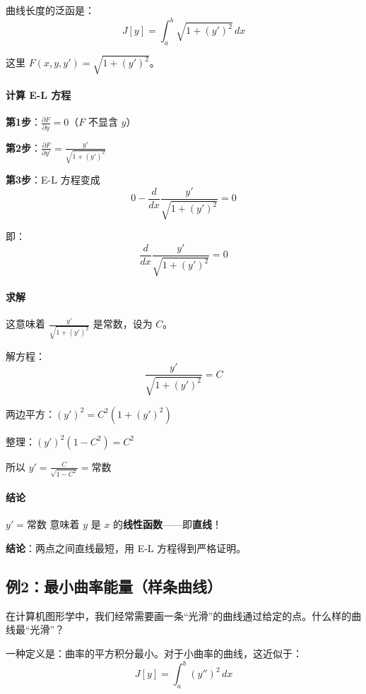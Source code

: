 曲线长度的泛函是：
\[
J[y] = \int_a^b \sqrt{1 + (y')^2} \, dx
\]

这里 $F(x, y, y') = \sqrt{1 + (y')^2}$。

\paragraph{计算 E-L 方程}

\textbf{第1步}：$\frac{\partial F}{\partial y} = 0$（$F$ 不显含 $y$）

\textbf{第2步}：$\frac{\partial F}{\partial y'} = \frac{y'}{\sqrt{1 + (y')^2}}$

\textbf{第3步}：E-L 方程变成
\[
0 - \frac{d}{dx} \frac{y'}{\sqrt{1 + (y')^2}} = 0
\]

即：
\[
\frac{d}{dx} \frac{y'}{\sqrt{1 + (y')^2}} = 0
\]

\paragraph{求解}

这意味着 $\frac{y'}{\sqrt{1 + (y')^2}}$ 是常数，设为 $C$。

解方程：
\[
\frac{y'}{\sqrt{1 + (y')^2}} = C
\]

两边平方：$(y')^2 = C^2 (1 + (y')^2)$

整理：$(y')^2 (1 - C^2) = C^2$

所以 $y' = \frac{C}{\sqrt{1-C^2}} = \text{常数}$

\paragraph{结论}

$y' = \text{常数}$ 意味着 $y$ 是 $x$ 的\textbf{线性函数}——即\textbf{直线}！

\begin{tcolorbox}[colback=green!5, colframe=green!60!black]
\textbf{结论}：两点之间直线最短，用 E-L 方程得到严格证明。
\end{tcolorbox}

\subsection{例2：最小曲率能量（样条曲线）}

在计算机图形学中，我们经常需要画一条“光滑”的曲线通过给定的点。什么样的曲线最“光滑”？

一种定义是：曲率的平方积分最小。对于小曲率的曲线，这近似于：
\[
J[y] = \int_a^b (y'')^2 \, dx
\]

